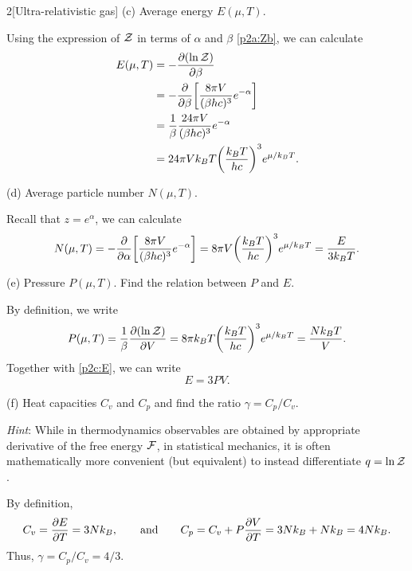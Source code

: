 \documentclass[12pt]{article}
\begin{document}
\begin{problem}{2}[Ultra-relativistic gas]
(c) Average energy $E(\mu,T)$.
\begin{solution}
Using the expression of $\mathcal{Z}$ in terms of $\alpha$ and $\beta$ \eqref{p2a:Zb}, 
we can calculate
\begin{align}\label{p2c:E}
    E(\mu,T)
    &=-\frac{\partial(\ln\mathcal{Z})}{\partial\beta}\notag\\
    &=-\frac{\partial}{\partial\beta}\qty[\frac{8\pi V}{(\beta
    hc)^3}e^{-\alpha}]\notag\\
    &=\frac1\beta\frac{24\pi V}{(\beta hc)^3}e^{-\alpha}\notag\\
    &=24\pi Vk_BT\qty(\frac{k_BT}{hc})^3e^{\mu/k_BT}.
\end{align}
\end{solution}

(d) Average particle number $N(\mu,T)$.
\begin{solution}
Recall that $z=e^{\alpha}$, we can calculate
\begin{align}
    N(\mu,T)
    =-\frac{\partial}{\partial\alpha}\qty[\frac{8\pi V}{(\beta
    hc)^3}e^{-\alpha}]
    =8\pi V\qty(\frac{k_BT}{hc})^3e^{\mu/k_BT}
    =\frac{E}{3k_BT}.
\end{align}
\end{solution}

(e) Pressure $P(\mu,T)$. Find the relation between $P$ and $E$.
\begin{solution}
By definition, we write
\begin{align}
    P(\mu,T)
    =\frac1\beta\frac{\partial(\ln\mathcal{Z})}{\partial V}
    =8\pi k_BT\qty(\frac{k_BT}{hc})^3e^{\mu/k_BT}
    =\frac{Nk_BT}{V}.
\end{align}
Together with \eqref{p2c:E}, we can write
\begin{equation}
    E=3PV.
\end{equation}
\end{solution}

(f) Heat capacities $C_v$ and $C_p$ and find the ratio $\gamma=C_p/C_v$.

\textit{Hint}: While in thermodynamics observables are obtained by appropriate
derivative of the free energy $\mathcal{F}$, in statistical mechanics, it is often
mathematically more convenient (but equivalent) to instead differentiate
$q=\ln\mathcal{Z}$.
\begin{solution}
By definition,
\begin{align}
    C_v=\frac{\partial E}{\partial T}=3Nk_B,
    \qquad\text{and}\qquad
    C_p=C_v+P\frac{\partial V}{\partial T}
    =3Nk_B+Nk_B=4Nk_B.
\end{align}
Thus, $\gamma=C_p/C_v=4/3$.
\end{solution}
\end{problem}
\end{document}
